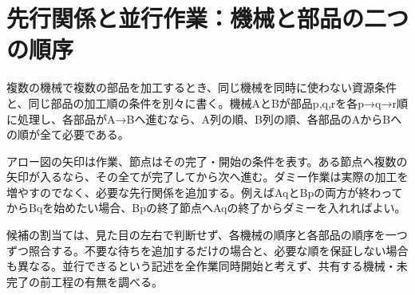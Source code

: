 \section{先行関係と並行作業：機械と部品の二つの順序}
\label{theory:discrete:precedence}
複数の機械で複数の部品を加工するとき、同じ機械を同時に使わない資源条件と、同じ部品の加工順の条件を別々に書く。機械AとBが部品p,q,rを各p→q→r順に処理し、各部品がA→Bへ進むなら、A列の順、B列の順、各部品のAからBへの順が全て必要である。

アロー図の矢印は作業、節点はその完了・開始の条件を表す。ある節点へ複数の矢印が入るなら、その全てが完了してから次へ進む。ダミー作業は実際の加工を増やすのでなく、必要な先行関係を追加する。例えばAqとBpの両方が終わってからBqを始めたい場合、Bpの終了節点へAqの終了からダミーを入れればよい。

候補の割当ては、見た目の左右で判断せず、各機械の順序と各部品の順序を一つずつ照合する。不要な待ちを追加するだけの場合と、必要な順を保証しない場合も異なる。並行できるという記述を全作業同時開始と考えず、共有する機械・未完了の前工程の有無を調べる。

